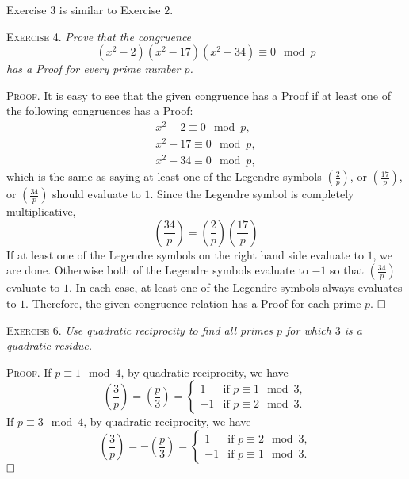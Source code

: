\documentclass[11pt, leqno]{article}
\newcommand{\done}{\ensuremath{\hfill\square}}
\begin{document}
Exercise $3$ is similar to Exercise $2$.

\textsc{Exercise 4}. \emph{Prove that the congruence 
\begin{displaymath}
(x^2-2)(x^2-17)(x^2-34) \equiv 0 \mod p
\end{displaymath}
has a Proof for every prime number $p$.}

\textsc{Proof}. It is easy to see that the given congruence has a Proof if at least one of the following congruences has a Proof: 
\begin{align*}
  x^2 - 2 \equiv  0 \mod p, \\
  x^2 - 17 \equiv 0 \mod p, \\
  x^2 - 34 \equiv 0 \mod p,
\end{align*}
which is the same as saying at least one of the Legendre symbols $\left( \frac{2}{p} \right)$, or $\left( \frac{17}{p} \right)$, or $\left( \frac{34}{p} \right)$ should evaluate to $1$. Since the Legendre symbol is completely multiplicative, 
\begin{displaymath}
\left( \frac{34}{p} \right) = \left( \frac{2}{p} \right) \left( \frac{17}{p} \right)
\end{displaymath}
If at least one of the Legendre symbols on the right hand side evaluate to $1$, we are done. Otherwise both of the Legendre symbols evaluate to $-1$ so that $\left( \frac{34}{p} \right)$ evaluate to $1$. In each case, at least one of the Legendre symbols always evaluates to $1$. Therefore, the given congruence relation has a Proof for each prime $p$. \done

\textsc{Exercise 6}. \emph{Use quadratic reciprocity to find all primes $p$ for which $3$ is a quadratic residue.}

\textsc{Proof}. If $p \equiv 1 \mod 4$, by quadratic reciprocity, we have 
\begin{displaymath}
\left( \frac{3}{p} \right) = \left( \frac{p}{3} \right) =
\begin{cases}
  1 & \text{if } p \equiv 1 \mod 3,\\
  -1 & \text{if } p \equiv 2 \mod 3.\
\end{cases}
\end{displaymath}
If $p \equiv 3 \mod 4$, by quadratic reciprocity, we have 
\begin{displaymath}
\left( \frac{3}{p} \right) = -\left( \frac{p}{3} \right) =
\begin{cases}
  1 & \text{if } p \equiv 2 \mod 3,\\
  -1 & \text{if } p \equiv 1 \mod 3.
\end{cases}
\end{displaymath}
\done
\end{document}
